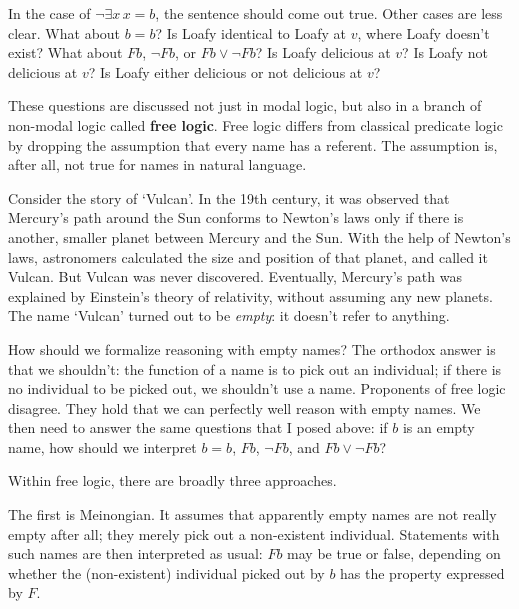 In the case of $\neg \exists x\, x\!=\!b$, the sentence should come out true.
Other cases are less clear. What about $b\!=\!b$? Is Loafy identical to Loafy at
$v$, where Loafy doesn't exist? What about $Fb$, $\neg Fb$, or
$Fb \lor \neg Fb$? Is Loafy delicious at $v$? Is Loafy not delicious at $v$? Is
Loafy either delicious or not delicious at $v$?

These questions are discussed not just in modal logic, but also in a branch of
non-modal logic called \textbf{free logic}. Free logic differs from classical
predicate logic by dropping the assumption that every name has a referent. The
assumption is, after all, not true for names in natural language.

Consider the story of `Vulcan'. In the 19th century, it was observed that
Mercury's path around the Sun conforms to Newton's laws only if there is
another, smaller planet between Mercury and the Sun. With the help of Newton's
laws, astronomers calculated the size and position of that planet, and called it
Vulcan. But Vulcan was never discovered. Eventually, Mercury's path was
explained by Einstein's theory of relativity, without assuming any new planets.
The name `Vulcan' turned out to be \emph{empty}: it doesn't refer to anything.


How should we formalize reasoning with empty names? The orthodox answer is that
we shouldn't: the function of a name is to pick out an individual; if there is
no individual to be picked out, we shouldn't use a name. Proponents of free
logic disagree. They hold that we can perfectly well reason with empty names. We
then need to answer the same questions that I posed above: if $b$ is an empty
name, how should we interpret $b=b$, $Fb$, $\neg Fb$, and $Fb \lor \neg Fb$?

Within free logic, there are broadly three approaches.

The first is Meinongian. It assumes that apparently empty names are not really
empty after all; they merely pick out a non-existent individual. Statements with
such names are then interpreted as usual: $Fb$ may be true or false, depending
on whether the (non-existent) individual picked out by $b$ has the property
expressed by $F$.

